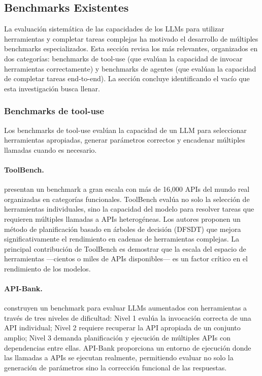 \subsection{Benchmarks Existentes}

La evaluación sistemática de las capacidades de los LLMs para utilizar
herramientas y completar tareas complejas ha motivado el desarrollo de
múltiples benchmarks especializados. Esta sección revisa los más relevantes,
organizados en dos categorías: benchmarks de tool-use (que evalúan la capacidad
de invocar herramientas correctamente) y benchmarks de agentes (que evalúan la
capacidad de completar tareas end-to-end). La sección concluye identificando el
vacío que esta investigación busca llenar.

\subsubsection{Benchmarks de tool-use}

Los benchmarks de tool-use evalúan la capacidad de un LLM para seleccionar
herramientas apropiadas, generar parámetros correctos y encadenar múltiples
llamadas cuando es necesario.

\paragraph{ToolBench.} \citet{toolbench2023} presentan un benchmark a gran
escala con más de 16,000 APIs del mundo real organizadas en categorías
funcionales. ToolBench evalúa no solo la selección de herramientas individuales,
sino la capacidad del modelo para resolver tareas que requieren múltiples
llamadas a APIs heterogéneas. Los autores proponen un método de planificación
basado en árboles de decisión (DFSDT) que mejora significativamente el
rendimiento en cadenas de herramientas complejas. La principal contribución de
ToolBench es demostrar que la escala del espacio de herramientas ---cientos o
miles de APIs disponibles--- es un factor crítico en el rendimiento de los
modelos.

\paragraph{API-Bank.} \citet{apibank2023} construyen un benchmark para evaluar
LLMs aumentados con herramientas a través de tres niveles de dificultad: Nivel
1 evalúa la invocación correcta de una API individual; Nivel 2 requiere
recuperar la API apropiada de un conjunto amplio; Nivel 3 demanda planificación
y ejecución de múltiples APIs con dependencias entre ellas. API-Bank
proporciona un entorno de ejecución donde las llamadas a APIs se ejecutan
realmente, permitiendo evaluar no solo la generación de parámetros sino la
corrección funcional de las respuestas.

